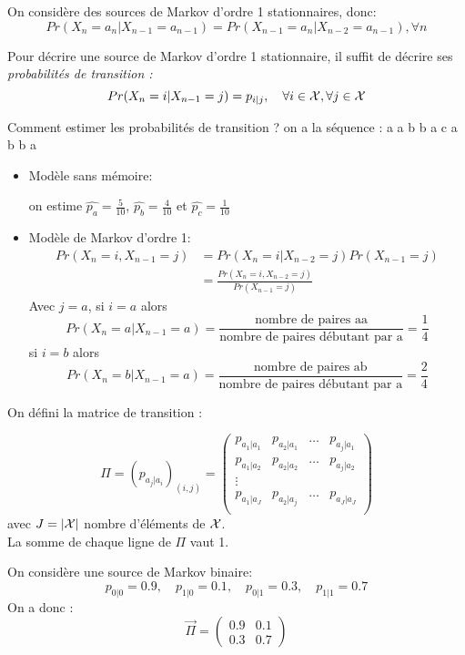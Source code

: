 \documentclass[main.tex]{subfiles}
\begin{document}
On considère des sources de Markov d'ordre 1 stationnaires, donc:
\[Pr(X_n=a_n|X_{n-1} = a_{n-1}) = Pr(X_{n-1} = a_n | X_{n-2} = a_{n-1}), \forall n\]
\begin{defin}
Pour décrire une source de Markov d'ordre 1 stationnaire, il suffit de décrire ses \emph{probabilités de transition :}
\[Pr(X_{n}=i|X_{n-1}=j) = p_{i|j},\quad \forall i \in \mathcal{X}, \forall j \in \mathcal{X}\]
\end{defin}
\begin{exemple}
Comment estimer les probabilités de transition ?
on a la séquence : a a b b a c a b b a
\begin{itemize}
\item Modèle sans mémoire:

  on estime $\hat{p_a} = \frac{5}{10}$, $\hat{p_b} = \frac{4}{10}$ et $\hat{p_c} = \frac{1}{10}$\\

\item Modèle de Markov d'ordre 1:
\begin{align*}
Pr(X_{n}=i,X_{n-1}=j) &= Pr(X_{n}=i|X_{n-2}=j)Pr(X_{n-1}=j)\\
&= \frac{Pr(X_{n}=i,X_{n-2}=j)}{Pr(X_{n-1}=j)}
\end{align*}
Avec $j=a$, si $i=a$ alors \[Pr(X_n=a|X_{n-1}=a) = \frac{\text{nombre de paires aa}}{\text{nombre de paires débutant par a}}=\frac{1}{4}\]
si $i = b$ alors \[Pr(X_n=b|X_{n-1}=a) = \frac{\text{nombre de paires ab}}{\text{nombre de paires débutant par a}}=\frac{2}{4}\]

\end{itemize}
\end{exemple}
\begin{defin}
On défini la matrice de transition :

\[\Pi = (p_{a_j|a_i})_{(i,j)} = \begin{pmatrix}
p_{a_1|a_1} & p_{a_2|a_1} & \dots & p_{a_j|a_1}\\
p_{a_1|a_2} & p_{a_2|a_2} & \dots & p_{a_j|a_2}\\
\vdots & & & \\
p_{a_1|a_J} & p_{a_2|a_j} & \dots & p_{a_J|a_J}\\
\end{pmatrix}\]
avec $J = |\mathcal{X}|$ nombre d'éléments de $\mathcal{X}$.\\
La somme de chaque ligne de $\Pi$ vaut 1.
\end{defin}
\begin{exemple}
On considère une source de Markov binaire:
\[p_{0|0} = 0.9, \quad p_{1|0} = 0.1, \quad p_{0|1} = 0.3, \quad p_{1|1} = 0.7\]
On a donc :
\[\vec{\Pi} = \begin{pmatrix}
0.9&0.1\\0.3&0.7
\end{pmatrix}\]
\end{exemple}
\end{document}

